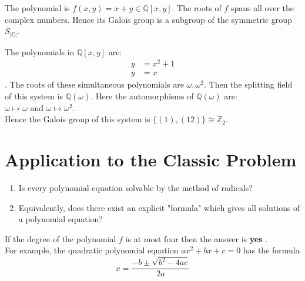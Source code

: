 \begin{example}
  The polynomial is \(f(x,y)=x+y \in \mathbb{Q}[x,y]\). The roots of \(f\) spans all over the complex numbers. Hence its Galois group is a subgroup of the symmetric group \(S_{|\mathbb{C}|}\).
\end{example}

\vspace{1mm}
\begin{example}
  The polynomials in \(\mathbb{Q}[x,y]\) are: \begin{align}
                         y &= x^2+1 \\
                         y &=x
                       \end{align}.
                       The roots of these simultaneous polynomials are \(\omega, {\omega}^2\). Then the splitting field of this system is \(\mathbb{Q}(\omega)\). Here the automorphisms of \(\mathbb{Q}(\omega)\) are: \\
       \(\omega \longmapsto \omega\) and \hspace{9mm} \(\omega \longmapsto {\omega}^2\).\\
                       Hence the Galois group of this system is \(\{(1), (12)\} \cong {\mathbb{Z}}_2\).
 \end{example}

 \section{Application to the Classic Problem}

 \begin{enumerate}
\item Is every polynomial equation solvable by the method of radicals?
\item Equivalently, does there exist an explicit "formula" which gives all solutions of a polynomial equation?
\end{enumerate}

If the degree of  the polynomial \(f\) is at most four then the answer is \textbf{yes} \cite{hunger}.\\
For example, the quadratic polynomial equation \(ax^2+bx+c=0\) has the formula \[x=\frac{-b \pm \sqrt{b^2-4ac}}{2a}\]
\vspace{3mm}

